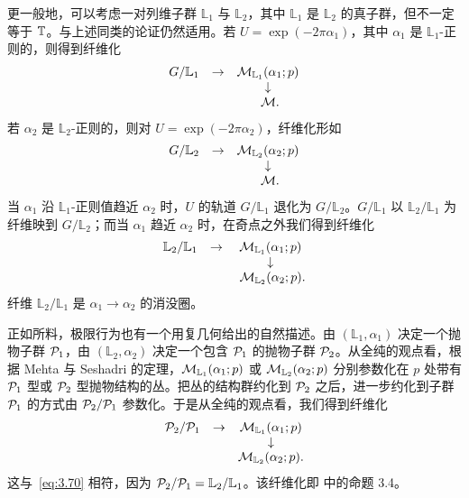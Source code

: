 更一般地，可以考虑一对列维子群 $\mathbb{L}_1$ 与 $\mathbb{L}_2$，其中 $\mathbb{L}_1$ 是 $\mathbb{L}_2$ 的真子群，但不一定等于 ${\mathbb{T}}$。与上述同类的论证仍然适用。若 $U=\exp(-2\pi\alpha_1)$，其中 $\alpha_1$ 是 $\mathbb{L}_1$-正则的，则得到纤维化
\setcounter{equation}{67}
\begin{equation}\label{eq:3.68}
  \begin{matrix}G/\mathbb{L}_1&\to& {\mathcal{M}}_{\mathbb{L}_1}(\alpha_1;p)\\
                                &   & \downarrow \\
                                & & ~{\mathcal{M}}. \end{matrix}
\end{equation}
若 $\alpha_2$ 是 $\mathbb{L}_2$-正则的，则对 $U=\exp(-2\pi\alpha_2)$，纤维化形如
\setcounter{equation}{68}
\begin{equation}\label{eq:3.69}
  \begin{matrix}G/\mathbb{L}_2&\to& {\mathcal{M}}_{\mathbb{L}_2}(\alpha_2;p)\\
                                &   & \downarrow \\
                                & & ~{\mathcal{M}}. \end{matrix}
\end{equation}
当 $\alpha_1$ 沿 $\mathbb{L}_1$-正则值趋近 $\alpha_2$ 时，$U$ 的轨道 $G/\mathbb{L}_1$ 退化为 $G/\mathbb{L}_2$。$G/\mathbb{L}_1$ 以 $\mathbb{L}_2/\mathbb{L}_1$ 为纤维映到 $G/\mathbb{L}_2$；而当 $\alpha_1$ 趋近 $\alpha_2$ 时，在奇点之外我们得到纤维化
\setcounter{equation}{69}
\begin{equation}\label{eq:3.70}
  \begin{matrix}\mathbb{L}_2/\mathbb{L}_1&\to& {\mathcal{M}}_{\mathbb{L}_1}(\alpha_1;p)\\
                                &   & \downarrow \\
                                & & ~{\mathcal{M}}_{\mathbb{L}_2}(\alpha_2;p). \end{matrix}
\end{equation}
纤维 $\mathbb{L}_2/\mathbb{L}_1$ 是 $\alpha_1\to\alpha_2$ 的消没圈。

正如所料，极限行为也有一个用复几何给出的自然描述。由 $(\mathbb{L}_1,\alpha_1)$ 决定一个抛物子群 $\mathcal{P}_1$，由 $(\mathbb{L}_2,\alpha_2)$ 决定一个包含 $\mathcal{P}_1$ 的抛物子群 $\mathcal{P}_2$。{}从全纯的观点看，根据 Mehta 与 Seshadri 的定理，${\mathcal{M}}_{\mathbb{L}_1}(\alpha_1;p)$ 或 ${\mathcal{M}}_{\mathbb{L}_2}(\alpha_2;p)$ 分别参数化在 $p$ 处带有 $\mathcal{P}_1$ 型或 $\mathcal{P}_2$ 型抛物结构的丛。把丛的结构群约化到 $\mathcal{P}_2$ 之后，进一步约化到子群 $\mathcal{P}_1$ 的方式由 $\mathcal{P}_2/\mathcal{P}_1$ 参数化。于是从全纯的观点看，我们得到纤维化
\setcounter{equation}{70}
\begin{equation}\label{eq:3.71}
  \begin{matrix}\mathcal{P}_2/\mathcal{P}_1&\to& {\mathcal{M}}_{\mathbb{L}_1}(\alpha_1;p)\\
                                &   & \downarrow \\
                                & & {\mathcal{M}}_{\mathbb{L}_2}(\alpha_2;p). \end{matrix}
\end{equation}
这与~\eqref{eq:3.70} 相符，因为 $\mathcal{P}_2/\mathcal{P}_1=\mathbb{L}_2/\mathbb{L}_1$。该纤维化即 \cite{ref60} 中的命题 3.4。

